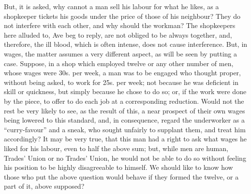 But, it is asked, why cannot a man sell his labour for what he likes, as
a shopkeeper tickets his goods under the price of those of his
neighbour? They do not interfere with each other, and why should the
workman? The shopkeepers here alluded to, Ave beg to reply, are not
obliged to be always together, and, therefore, the ill blood, which is
often intense, does not cause interference. But, in wages, the matter
assumes a very different aspect, as will be seen by putting a case.
Suppose, in a shop which employed twelve or any other number of men,
whose wages were 30s. per week, a man was to be engaged who thought
proper, without being asked, to work for 25s. per week; not because he
was deficient in skill or quickness, but simply because he chose to do
so; or, if the work were done by the piece, to offer to do each job at a
corresponding reduction. Would not the rest be very likely to see, as
the result of this, a near prospect of their own wages being lowered to
this standard, and, in consequence, regard the underworker as a
``curry-favour'' and a sneak, who sought unfairly to supplant them, and
treat him accordingly? It may be very true, that this man had a right to
ask what wages he liked for his labour, even to half the above sum; but,
while men are human, Trades' Union or no Trades' Union, he would not be
able to do so without feeling his position to be highly disagreeable to
himself. We should like to know how those who put the above question
would behave if they formed the twelve, or a part of it, above supposed?

